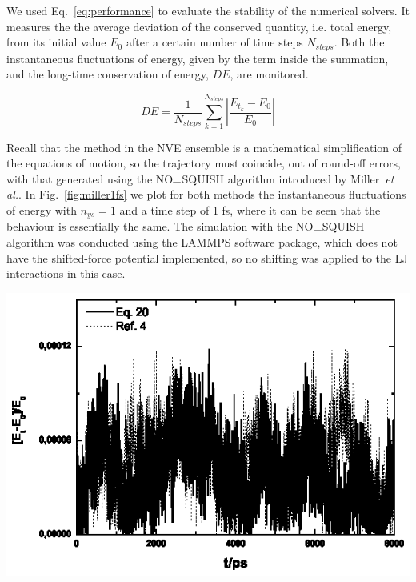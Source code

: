 \documentclass[aip,jcp,reprint,amsmath,amssymb]{revtex4-1}
\begin{document}
We used Eq.~\ref{eq:performance} to evaluate the stability of the numerical solvers. It measures the  the average deviation of the conserved quantity, i.e. total energy, from its initial value $E_0$ after a certain number of time steps $N_{steps}$. Both the instantaneous fluctuations of energy, given by the term inside the summation, and the long-time conservation of energy, $D E$, are monitored.  

\begin{equation}
\label{eq:performance}
D E =  \frac{1}{N_{steps}} \sum_{k=1}^{N_{steps}} \left| \frac{E_{t_k} - E_0}{E_0} \right|
\end{equation}

Recall that the method in the NVE ensemble is a mathematical simplification of the equations of motion, so the trajectory must coincide, out of round-off errors, with that generated using the NO$\rule{0.25cm}{0.15mm}$SQUISH algorithm introduced by Miller~\textit{et al.}\cite{Miller2002}. In Fig.~\ref{fig:miller1fs} we plot for both methods the instantaneous fluctuations of energy with $n_{ys} = 1 $ and a time step of 1 fs, where it can be seen that the behaviour is essentially the same. The simulation with the NO$\rule{0.25cm}{0.15mm}$SQUISH algorithm was conducted using the LAMMPS\cite{Plimpton1995} software package, which does not have the shifted-force potential implemented, so no shifting was applied to the LJ interactions in this case.

\begin{center}
  \includegraphics{miller1fs}
    \label{fig:miller1fs}
\end{center}
\end{document}
